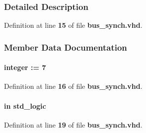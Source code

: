 \subsubsection{Detailed Description}


Definition at line {\bf 15} of file {\bf bus\+\_\+synch.\+vhd}.



\subsubsection{Member Data Documentation}
\paragraph[{bus\+\_\+w}]{ {\bfseries \textcolor{vhdlchar}{ }} {\bfseries \textcolor{comment}{integer}\textcolor{vhdlchar}{ }\textcolor{vhdlchar}{ }\textcolor{vhdlchar}{\+:}\textcolor{vhdlchar}{=}\textcolor{vhdlchar}{ }\textcolor{vhdlchar}{ } \textcolor{vhdldigit}{7} \textcolor{vhdlchar}{ }} \hspace{0.3cm}{\ttfamily [Generic]}}\label{classbus__synch_a31b719e365f91511fcaf4a37fb87ec71}


Definition at line {\bf 16} of file {\bf bus\+\_\+synch.\+vhd}.

\paragraph[{clk}]{ {\bfseries \textcolor{keywordflow}{in}\textcolor{vhdlchar}{ }} {\bfseries \textcolor{comment}{std\+\_\+logic}\textcolor{vhdlchar}{ }} \hspace{0.3cm}{\ttfamily [Port]}}\label{classbus__synch_a4a4609c199d30b3adebbeb3a01276ec5}


Definition at line {\bf 19} of file {\bf bus\+\_\+synch.\+vhd}.

\paragraph[{ieee}]{\hspace{0.3cm}{\ttfamily [Library]}}\label{classbus__synch_a0a6af6eef40212dbaf130d57ce711256}


